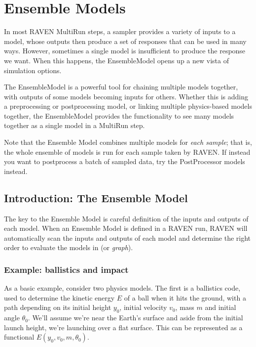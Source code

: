 \section{Ensemble Models}
\label{sec:ensembleModel}


In most RAVEN MultiRun steps, a sampler provides a variety of inputs to a model, whose outputs then produce a
set of responses that can be used in many ways.  However, sometimes a single model is insufficient to produce
the response we want.  When this happens, the EnsembleModel opens up a new vista of simulation options.

The EnsembleModel is a powerful tool for chaining multiple models together, with outputs of some models
becoming inputs for others.  Whether this is adding a preprocessing or postprocessing model, or linking
multiple physics-based models together, the EnsembleModel provides the functionality to see many models
together as a single model in a MultiRun step.

Note that the Ensemble Model combines multiple models for \emph{each sample}; that is, the whole ensemble of
models is run for each sample taken by RAVEN.  If instead you want to postprocess a batch of sampled data, try
the PostProcessor models instead.

\subsection{Introduction: The Ensemble Model}
The key to the Ensemble Model is careful definition of the inputs and outputs of each model.  When an
Ensemble Model is defined in a RAVEN run, RAVEN will automatically scan the inputs and outputs of each model
and determine the right order to evaluate the models in (or \emph{graph}).

\subsubsection{Example: ballistics and impact}
As a basic example, consider two physics models.  The first is a ballistics code, used to determine the
kinetic energy $E$ of a ball when it hits the ground, with a path depending on its initial height $y_0$, initial velocity
$v_0$, mass $m$ and initial angle $\theta_0$.  We'll assume we're near the Earth's surface and aside from the initial
launch height, we're launching over a flat surface.  This can be represented as a functional $E(y_0,v_0,m,\theta_0)$.

